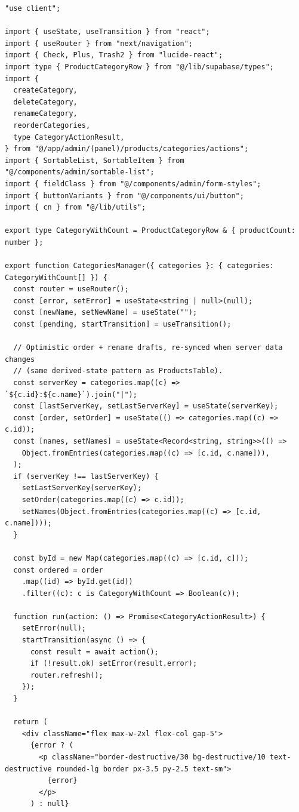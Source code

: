 \documentclass[11pt,a4paper]{article}
\begin{document}
\begin{lstlisting}
"use client";

import { useState, useTransition } from "react";
import { useRouter } from "next/navigation";
import { Check, Plus, Trash2 } from "lucide-react";
import type { ProductCategoryRow } from "@/lib/supabase/types";
import {
  createCategory,
  deleteCategory,
  renameCategory,
  reorderCategories,
  type CategoryActionResult,
} from "@/app/admin/(panel)/products/categories/actions";
import { SortableList, SortableItem } from "@/components/admin/sortable-list";
import { fieldClass } from "@/components/admin/form-styles";
import { buttonVariants } from "@/components/ui/button";
import { cn } from "@/lib/utils";

export type CategoryWithCount = ProductCategoryRow & { productCount: number };

export function CategoriesManager({ categories }: { categories: CategoryWithCount[] }) {
  const router = useRouter();
  const [error, setError] = useState<string | null>(null);
  const [newName, setNewName] = useState("");
  const [pending, startTransition] = useTransition();

  // Optimistic order + rename drafts, re-synced when server data changes
  // (same derived-state pattern as ProductsTable).
  const serverKey = categories.map((c) => `${c.id}:${c.name}`).join("|");
  const [lastServerKey, setLastServerKey] = useState(serverKey);
  const [order, setOrder] = useState(() => categories.map((c) => c.id));
  const [names, setNames] = useState<Record<string, string>>(() =>
    Object.fromEntries(categories.map((c) => [c.id, c.name])),
  );
  if (serverKey !== lastServerKey) {
    setLastServerKey(serverKey);
    setOrder(categories.map((c) => c.id));
    setNames(Object.fromEntries(categories.map((c) => [c.id, c.name])));
  }

  const byId = new Map(categories.map((c) => [c.id, c]));
  const ordered = order
    .map((id) => byId.get(id))
    .filter((c): c is CategoryWithCount => Boolean(c));

  function run(action: () => Promise<CategoryActionResult>) {
    setError(null);
    startTransition(async () => {
      const result = await action();
      if (!result.ok) setError(result.error);
      router.refresh();
    });
  }

  return (
    <div className="flex max-w-2xl flex-col gap-5">
      {error ? (
        <p className="border-destructive/30 bg-destructive/10 text-destructive rounded-lg border px-3.5 py-2.5 text-sm">
          {error}
        </p>
      ) : null}


\end{lstlisting}
\end{document}
